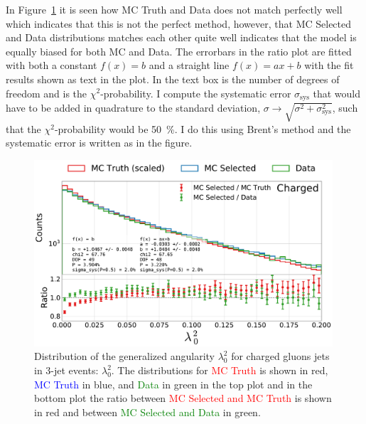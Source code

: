 In Figure~\ref{fig:q:generalized_angularities_cha_lambda_0_2_nonappendix} it is seen how MC Truth and Data does not match perfectly well which indicates that this is not the perfect method, however, that MC Selected and Data distributions matches each other quite well indicates that the model is equally biased for both MC and Data. 
The errorbars in the ratio plot are fitted with both a constant ${f(x)=b}$ and a straight line $f(x)=ax+b$ with the fit results shown as text in the plot. In the text box  is the number of degrees of freedom and  is the $\chi^2$-probability. I compute the systematic error $\sigma_\mathrm{sys}$ that would have to be added in quadrature to the standard deviation, $\sigma \rightarrow \sqrt{\sigma^2 + \sigma_\mathrm{sys}^2}$, such that the $\chi^2$-probability would be \SI{50}{\percent}. I do this using Brent's method \autocite{Brent:113464} and the systematic error is written as  in the figure. 

\begin{figure}[h!]
  \centerfloat
  \includegraphics[width=0.99\textwidth, trim=0 0 0 0, clip, page=1]{figures/quarks/generalized_angularities_cha-down_sample=1.00-ML_vars=vertex-selection=b-ejet_min=4-n_iter_RS_lgb=99-n_iter_RS_xgb=9-cdot_cut=0.90-version=19.pdf}
  \caption[Generalized Angularities for Charged Gluons Jets in 3-Jet Events: $\lambda_0^2$]
          {Distribution of the generalized angularity $\lambda_0^2$ for charged gluons jets in 3-jet events: $\lambda_0^2$. The distributions for \textcolor{red}{MC Truth} is shown in red, \textcolor{blue}{MC Truth} in blue, and \textcolor{green}{Data} in green in the top plot and in the bottom plot the ratio between \textcolor{red}{MC Selected and MC Truth} is shown in red and between \textcolor{green}{MC Selected and Data} in green. }
  \label{fig:q:generalized_angularities_cha_lambda_0_2_nonappendix}
\end{figure}
\vspace{-3mm} 

